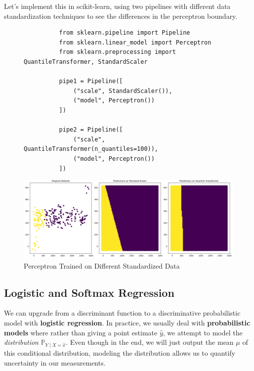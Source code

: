 \documentclass{article}
\begin{document}
    \begin{code}
      Let's implement this in scikit-learn, using two pipelines with different data standardization techniques to see the differences in the perceptron boundary. 

      \begin{figure}[H]
        \centering 
        \begin{lstlisting}
          from sklearn.pipeline import Pipeline 
          from sklearn.linear_model import Perceptron
          from sklearn.preprocessing import QuantileTransformer, StandardScaler

          pipe1 = Pipeline([ 
              ("scale", StandardScaler()), 
              ("model", Perceptron())
          ])

          pipe2 = Pipeline([
              ("scale", QuantileTransformer(n_quantiles=100)), 
              ("model", Perceptron())
          ])
        \end{lstlisting}
        \caption{} 
        \label{fig:Perceptron_Code}
      \end{figure}

      \begin{figure}[H]
        \centering
        \includegraphics[scale=0.35]{img/Perceptron.png}
        \caption{Perceptron Trained on Different Standardized Data}
        \label{fig:Percepton_on_Standardized_data}
      \end{figure}
    \end{code}

  \subsection{Logistic and Softmax Regression} 

    We can upgrade from a discriminant function to a discriminative probabilistic model with \textbf{logistic regression}. In practice, we usually deal with \textbf{probabilistic models} where rather than giving a point estimate $\hat{y}$, we attempt to model the \textit{distribution} $\mathbb{P}_{Y \mid X = \hat{x}}$. Even though in the end, we will just output the mean $\mu$ of this conditional distribution, modeling the distribution allows us to quantify uncertainty in our measurements. 
\end{document}
